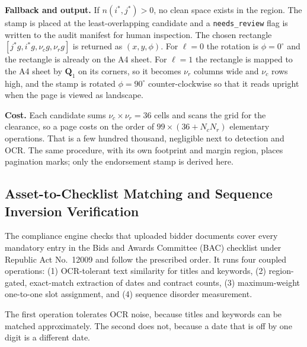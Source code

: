 \textbf{Fallback and output.} If $n(i^*,j^*)>0$, no clean space exists in the region. The stamp is placed at the least-overlapping candidate and a \texttt{needs\_review} flag is written to the audit manifest for human inspection. The chosen rectangle $[j^*g,i^*g,\nu_cg,\nu_rg]$ is returned as $(x, y, \phi)$. For $\ell = 0$ the rotation is $\phi = 0^\circ$ and the rectangle is already on the A4 sheet. For $\ell = 1$ the rectangle is mapped to the A4 sheet by $\mathbf Q_1$ on its corners, so it becomes $\nu_r$ columns wide and $\nu_c$ rows high, and the stamp is rotated $\phi = 90^\circ$ counter-clockwise so that it reads upright when the page is viewed as landscape.

\textbf{Cost.} Each candidate sums $\nu_c\times\nu_r=36$ cells and scans the grid for the clearance, so a page costs on the order of $99\times(36+N_cN_r)$ elementary operations. That is a few hundred thousand, negligible next to detection and OCR. The same procedure, with its own footprint and margin region, places pagination marks; only the endorsement stamp is derived here.

\subsection{Asset-to-Checklist Matching and Sequence Inversion Verification}
\label{sec:checklist_matching}

The compliance engine checks that uploaded bidder documents cover every mandatory entry in the Bids and Awards Committee (BAC) checklist under Republic Act No.~12009 and follow the prescribed order. It runs four coupled operations: (1) OCR-tolerant text similarity for titles and keywords, (2) region-gated, exact-match extraction of dates and contract counts, (3) maximum-weight one-to-one slot assignment, and (4) sequence disorder measurement.

The first operation tolerates OCR noise, because titles and keywords can be matched approximately. The second does not, because a date that is off by one digit is a different date.

